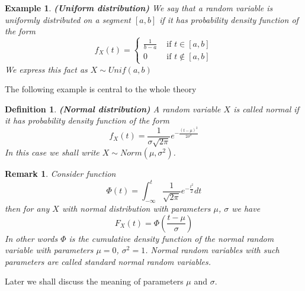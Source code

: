 \documentclass[12pt]{article}
\newtheorem{remark}[theorem]{Remark}
\newtheorem{definition}[theorem]{Definition}
\newtheorem{example}[theorem]{Example}
\begin{document}
\begin{example} \textbf{(Uniform distribution)} We say that a random variable is
    uniformly distributed on a segment $[a, b]$ if it has probability density
    function of the form
    $$
        f_X(t)
        =\begin{cases}
            \frac{1}{b-a} & \mbox{ if } t\in[a,b]    \\
            0             & \mbox{ if } t\notin[a,b]
        \end{cases}
    $$
    We express this fact as $X\sim Unif(a, b)$
\end{example}

The following example is central to the whole theory

\begin{definition} \textbf{(Normal distribution)} A random variable $X$ is
    called normal if it has probability density function of the form
    $$
        f_X(t)
        =\frac{1}{\sigma\sqrt{2\pi}} e^{-\frac{{(t-\mu)}^2}{2\sigma^2}}
    $$
    In this case we shall write $X\sim Norm(\mu,\sigma^2)$.
\end{definition}

\begin{remark} Consider function
    $$
        \Phi(t)=\int_{-\infty}^t\frac{1}{\sqrt{2\pi}}e^{-\frac{t^2}{2}}dt
    $$
    then for any $X$ with normal distribution with parameters $\mu$, $\sigma$ we
    have
    $$
        F_X(t)=\Phi\left(\frac{t-\mu}{\sigma}\right)
    $$
    In other words $\Phi$ is the cumulative density function of the normal
    random variable with parameters $\mu=0$, $\sigma^2=1$. Normal random
    variables with such parameters are called standard normal random variables.
\end{remark}

Later we shall discuss the meaning of parameters $\mu$ and $\sigma$.
\end{document}
